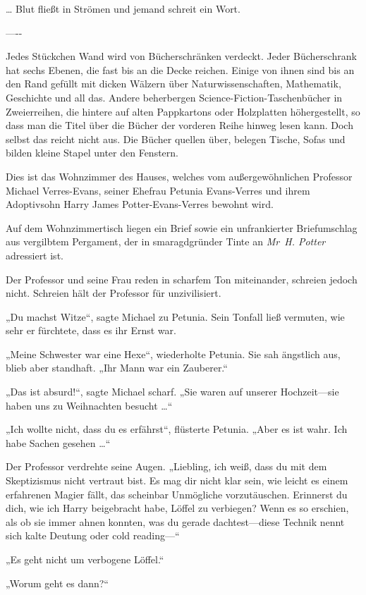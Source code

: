 {{… Blut fließt in Strömen und jemand schreit ein Wort.}

—\/-\/-

Jedes Stückchen Wand wird von Bücherschränken verdeckt. Jeder Bücherschrank hat sechs Ebenen, die fast bis an die Decke reichen. Einige von ihnen sind bis an den Rand gefüllt mit dicken Wälzern über Naturwissenschaften, Mathematik, Geschichte und all das. Andere beherbergen Science-Fiction-Taschenbücher in Zweierreihen, die hintere auf alten Pappkartons oder Holzplatten höhergestellt, so dass man die Titel über die Bücher der vorderen Reihe hinweg lesen kann. Doch selbst das reicht nicht aus. Die Bücher quellen über, belegen Tische, Sofas und bilden kleine Stapel unter den Fenstern.

Dies ist das Wohnzimmer des Hauses, welches vom außergewöhnlichen Professor Michael Verres-Evans, seiner Ehefrau Petunia Evans-Verres und ihrem Adoptivsohn Harry James Potter-Evans-Verres bewohnt wird.

Auf dem Wohnzimmertisch liegen ein Brief sowie ein unfrankierter Briefumschlag aus vergilbtem Pergament, der in smaragdgründer Tinte an \emph{Mr~H. Potter} adressiert ist.

Der Professor und seine Frau reden in scharfem Ton miteinander, schreien jedoch nicht. Schreien hält der Professor für unzivilisiert.

„Du machst Witze“, sagte Michael zu Petunia. Sein Tonfall ließ vermuten, wie sehr er fürchtete, dass es ihr Ernst war.

„Meine Schwester war eine Hexe“, wiederholte Petunia. Sie sah ängstlich aus, blieb aber standhaft. „Ihr Mann war ein Zauberer.“

„Das ist absurd!“, sagte Michael scharf. „Sie waren auf unserer Hochzeit—sie haben uns zu Weihnachten besucht …“

„Ich wollte nicht, dass du es erfährst“, flüsterte Petunia. „Aber es ist wahr. Ich habe Sachen gesehen …“

Der Professor verdrehte seine Augen. „Liebling, ich weiß, dass du mit dem Skeptizismus nicht vertraut bist. Es mag dir nicht klar sein, wie leicht es einem erfahrenen Magier fällt, das scheinbar Unmögliche vorzutäuschen. Erinnerst du dich, wie ich Harry beigebracht habe, Löffel zu verbiegen? Wenn es so erschien, als ob sie immer ahnen konnten, was du gerade dachtest—diese Technik nennt sich kalte Deutung oder cold reading—“

„Es geht nicht um verbogene Löffel.“

„Worum geht es dann?“

}

